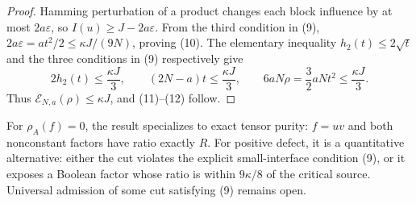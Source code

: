 \begin{proof}
Hamming perturbation of a product changes each block influence by at most
$2a\varepsilon$, so
$I(u)\ge J-2a\varepsilon$.  From the third condition in (9),
$2a\varepsilon=a t^2/2\le\kappa J/(9N)$, proving (10).
The elementary inequality $h_2(t)\le2\sqrt t$ and the three conditions in
(9) respectively give
\[
 2h_2(t)\le\frac{\kappa J}{3},\qquad
 (2N-a)t\le\frac{\kappa J}{3},\qquad
 6aN\rho=\frac32aNt^2\le\frac{\kappa J}{3}.
\]
Thus $\mathcal E_{N,a}(\rho)\le\kappa J$, and (11)--(12) follow.
\end{proof}

For $\rho_A(f)=0$, the result specializes to exact tensor purity: $f=uv$ and
both nonconstant factors have ratio exactly $R$.  For positive defect, it is a
quantitative alternative: either the cut violates the explicit small-interface
condition (9), or it exposes a Boolean factor whose ratio is within
$9\kappa/8$ of the critical source.  Universal admission of some cut satisfying
(9) remains open.
